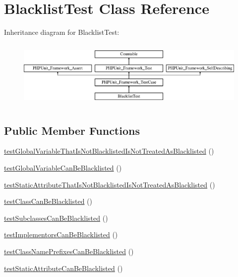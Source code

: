 \hypertarget{class_sebastian_bergmann_1_1_global_state_1_1_blacklist_test}{}\section{Blacklist\+Test Class Reference}
\label{class_sebastian_bergmann_1_1_global_state_1_1_blacklist_test}
Inheritance diagram for Blacklist\+Test\+:\begin{figure}[H]
\begin{center}
\leavevmode
\includegraphics[height=3.303835cm]{class_sebastian_bergmann_1_1_global_state_1_1_blacklist_test}
\end{center}
\end{figure}
\subsection*{Public Member Functions}
\begin{DoxyCompactItemize}
\item 
\mbox{\hyperlink{class_sebastian_bergmann_1_1_global_state_1_1_blacklist_test_ad40a6815a37737f44b8e016cb57e3862}{test\+Global\+Variable\+That\+Is\+Not\+Blacklisted\+Is\+Not\+Treated\+As\+Blacklisted}} ()
\item 
\mbox{\hyperlink{class_sebastian_bergmann_1_1_global_state_1_1_blacklist_test_a30eaf26d44ce75eab82a097754d20376}{test\+Global\+Variable\+Can\+Be\+Blacklisted}} ()
\item 
\mbox{\hyperlink{class_sebastian_bergmann_1_1_global_state_1_1_blacklist_test_a5b88ac47f2755eac1769d18f7dd81921}{test\+Static\+Attribute\+That\+Is\+Not\+Blacklisted\+Is\+Not\+Treated\+As\+Blacklisted}} ()
\item 
\mbox{\hyperlink{class_sebastian_bergmann_1_1_global_state_1_1_blacklist_test_a51863e3ded15b718a91184eb16dd74e7}{test\+Class\+Can\+Be\+Blacklisted}} ()
\item 
\mbox{\hyperlink{class_sebastian_bergmann_1_1_global_state_1_1_blacklist_test_abf3592ff6babd1907b25c0a7595c631b}{test\+Subclasses\+Can\+Be\+Blacklisted}} ()
\item 
\mbox{\hyperlink{class_sebastian_bergmann_1_1_global_state_1_1_blacklist_test_a342a672f4e8e60254fda2e429eb77ec9}{test\+Implementors\+Can\+Be\+Blacklisted}} ()
\item 
\mbox{\hyperlink{class_sebastian_bergmann_1_1_global_state_1_1_blacklist_test_ad0b1be5dfae7af193de5e3aeed36eaa8}{test\+Class\+Name\+Prefixes\+Can\+Be\+Blacklisted}} ()
\item 
\mbox{\hyperlink{class_sebastian_bergmann_1_1_global_state_1_1_blacklist_test_a2d5f21a2f7e23ada76d9ae464513290a}{test\+Static\+Attribute\+Can\+Be\+Blacklisted}} ()
\end{DoxyCompactItemize}
